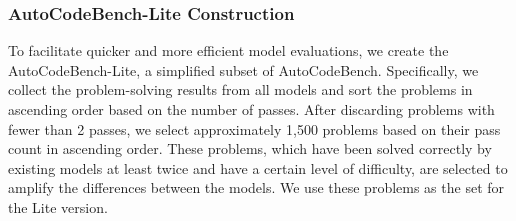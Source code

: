 \subsubsection{AutoCodeBench-Lite Construction}

To facilitate quicker and more efficient model evaluations, we create the AutoCodeBench-Lite, a simplified subset of AutoCodeBench.
Specifically, we collect the problem-solving results from all models and sort the problems in ascending order based on the number of passes. After discarding problems with fewer than 2 passes, we select approximately 1,500 problems based on their pass count in ascending order. These problems, which have been solved correctly by existing models at least twice and have a certain level of difficulty, are selected to amplify the differences between the models. We use these problems as the set for the Lite version.



